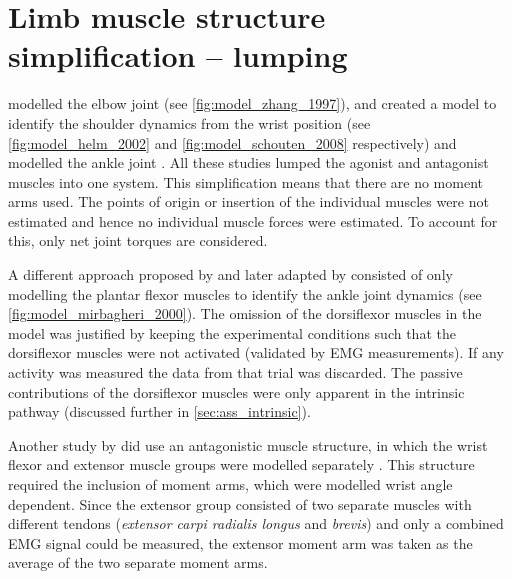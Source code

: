 \section{Limb muscle structure simplification -- lumping }
\label{sec:lumping}
\citeauthor{zhang_simultaneous_1997} modelled the elbow joint \cite{zhang_simultaneous_1997} (see \autoref{fig:model_zhang_1997}), \citeauthor{van_der_helm_identification_2002} and \citeauthor{schouten_nmclab_2008} created a model to identify the shoulder dynamics from the wrist position \cite{van_der_helm_identification_2002, schouten_nmclab_2008} (see \autoref{fig:model_helm_2002} and \ref{fig:model_schouten_2008} respectively) and \citeauthor{mugge_rigorous_2010} modelled the ankle joint \cite{mugge_rigorous_2010}. All these studies lumped the agonist and antagonist muscles into one system. This simplification means that there are no moment arms used. The points of origin or insertion of the individual muscles were not estimated and hence no individual muscle forces were estimated. To account for this, only net joint torques are considered. 

A different approach proposed by \citeauthor{kearney_identification_1997} and later adapted by \citeauthor{mirbagheri_intrinsic_2000} consisted of only modelling the plantar flexor muscles to identify the ankle joint dynamics \cite{kearney_identification_1997, mirbagheri_intrinsic_2000} (see \autoref{fig:model_mirbagheri_2000}). The omission of the dorsiflexor muscles in the model was justified by keeping the experimental conditions such that the dorsiflexor muscles were not activated (validated by EMG measurements). If any activity was measured the data from that trial was discarded. The passive contributions of the dorsiflexor muscles were only apparent in the intrinsic pathway (discussed further in \autoref{sec:ass_intrinsic}). 

Another study by \citeauthor{de_gooijer-van_de_groep_estimation_2016} did use an antagonistic muscle structure, in which the wrist flexor and extensor muscle groups were modelled separately \cite{de_gooijer-van_de_groep_estimation_2016}. This structure required the inclusion of moment arms, which were modelled wrist angle dependent. Since the extensor group consisted of two separate muscles with different tendons (\textit{extensor carpi radialis longus} and \textit{brevis}) and only a combined EMG signal could be measured, the extensor moment arm was taken as the average of the two separate moment arms. 



